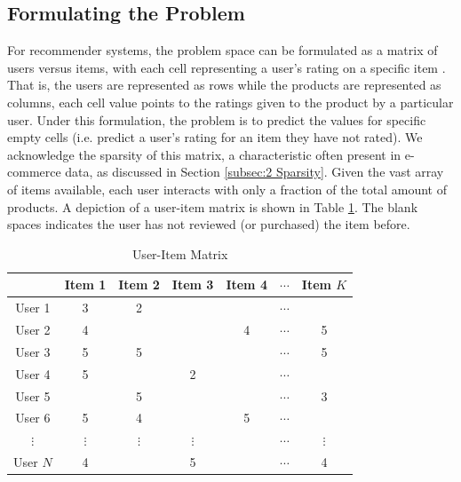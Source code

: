 \subsection{Formulating the Problem}
\label{subsec:4 Formulating the Problem}

For recommender systems, the problem space can be formulated as a matrix of users versus items, with each cell representing a user’s rating on a specific item \cite{jannach2010recommender}. That is, the users are represented as rows while the products are represented as columns, each cell value points to the ratings given to the product by a particular user. Under this formulation, the problem is to predict the values for specific empty cells (i.e. predict a user’s rating for an item they have not rated). We acknowledge the sparsity of this matrix, a characteristic often present in e-commerce data, as discussed in Section \ref{subsec:2 Sparsity}. Given the vast array of items available, each user interacts with only a fraction of the total amount of products. A depiction of a user-item matrix is shown in Table \ref{tab:user_item_matrix}. The blank spaces indicates the user has not reviewed (or purchased) the item before.

\begin{table}[h]
    \centering
    \begin{tabular}{|c|c|c|c|c|c|c|}
    \hline
     & Item 1 & Item 2 & Item 3 & Item 4 & $\cdots$ & Item $K$ \\
    \hline
    User 1 & 3 & 2 &  &  & $\cdots$ &  \\
    User 2 & 4 &  &  & 4 & $\cdots$ & 5 \\
    User 3 & 5 & 5 & &  & $\cdots$ & 5 \\
    User 4 & 5 & & 2 &  & $\cdots$ &  \\
    User 5 &  & 5 & &  & $\cdots$ & 3 \\
    User 6 & 5 & 4 & &  5& $\cdots$ & \\
    $\vdots$ & $\vdots$ &  $\vdots$ & $\vdots$ &  & $\cdots$ & $\vdots$ \\
    User $N$ & 4 & & 5 &  & $\cdots$ & 4 \\
    \hline
    \end{tabular}
    \caption{User-Item Matrix}
    \label{tab:user_item_matrix}
\end{table}

